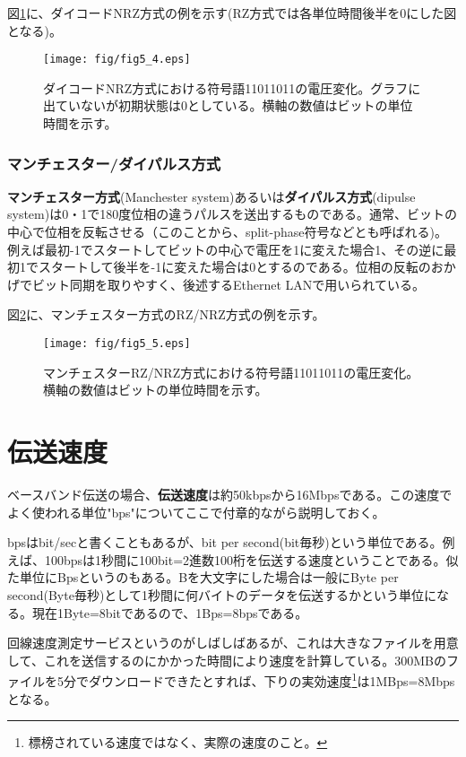 図\ref{fig5_4}に、ダイコードNRZ方式の例を示す(RZ方式では各単位時間後半を0にした図となる)。
\begin{figure}[htbp]
\centering
\texttt{[image: fig/fig5\_4.eps]}
\caption{ダイコードNRZ方式における符号語11011011の電圧変化。グラフに出ていないが初期状態は0としている。横軸の数値はビットの単位時間を示す。}
\label{fig5_4}
\end{figure}


\subsubsection{マンチェスター/ダイパルス方式}
\textbf{マンチェスター方式}(Manchester system)あるいは\textbf{ダイパルス方式}(dipulse system)は0・1で180度位相の違うパルスを送出するものである。通常、ビットの中心で位相を反転させる（このことから、split-phase符号などとも呼ばれる)。例えば最初-1でスタートしてビットの中心で電圧を1に変えた場合1、その逆に最初1でスタートして後半を-1に変えた場合は0とするのである。位相の反転のおかげでビット同期を取りやすく、後述するEthernet LANで用いられている。

図\ref{fig5_5}に、マンチェスター方式のRZ/NRZ方式の例を示す。
\begin{figure}[htbp]
\centering
\texttt{[image: fig/fig5\_5.eps]}
\caption{マンチェスターRZ/NRZ方式における符号語11011011の電圧変化。横軸の数値はビットの単位時間を示す。}
\label{fig5_5}
\end{figure}
    

\section{伝送速度}
ベースバンド伝送の場合、\textbf{伝送速度}は約50kbpsから16Mbpsである。この速度でよく使われる単位"bps"についてここで付章的ながら説明しておく。

bpsはbit/secと書くこともあるが、bit per second(bit毎秒)という単位である。例えば、100bpsは1秒間に100bit=2進数100桁を伝送する速度ということである。似た単位にBpsというのもある。Bを大文字にした場合は一般にByte per second(Byte毎秒)として1秒間に何バイトのデータを伝送するかという単位になる。現在1Byte=8bitであるので、1Bps=8bpsである。

回線速度測定サービスというのがしばしばあるが、これは大きなファイルを用意して、これを送信するのにかかった時間により速度を計算している。300MBのファイルを5分でダウンロードできたとすれば、下りの実効速度\footnote{標榜されている速度ではなく、実際の速度のこと。}は1MBps=8Mbpsとなる。

